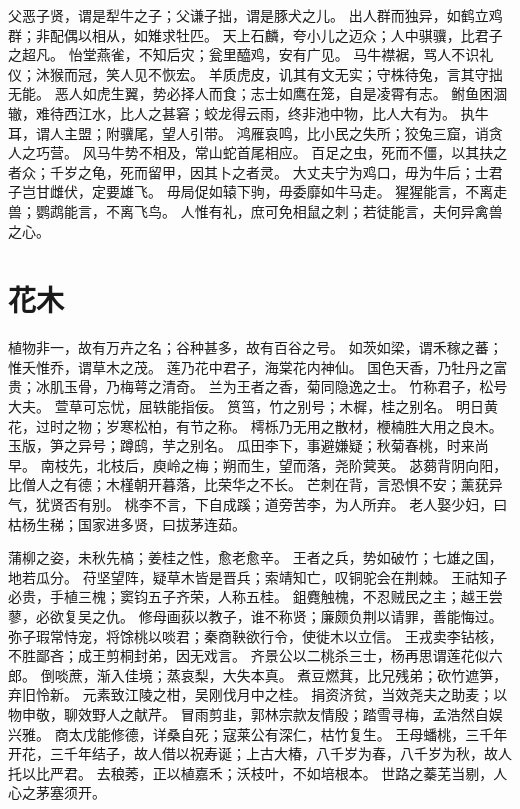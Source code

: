\documentclass[12pt,UTF8]{ctexbook}
\begin{document}
父恶子贤，谓是犁牛之子；父谦子拙，谓是豚犬之儿。
出人群而独异，如鹤立鸡群；非配偶以相从，如雉求牡匹。
天上石麟，夸小儿之迈众；人中骐骥，比君子之超凡。
怡堂燕雀，不知后灾；瓮里醯鸡，安有广见。
马牛襟裾，骂人不识礼仪；沐猴而冠，笑人见不恢宏。
羊质虎皮，讥其有文无实；守株待兔，言其守拙无能。
恶人如虎生翼，势必择人而食；志士如鹰在笼，自是凌霄有志。
鲋鱼困涸辙，难待西江水，比人之甚窘；蛟龙得云雨，终非池中物，比人大有为。
执牛耳，谓人主盟；附骥尾，望人引带。
鸿雁哀鸣，比小民之失所；狡兔三窟，诮贪人之巧营。
风马牛势不相及，常山蛇首尾相应。
百足之虫，死而不僵，以其扶之者众；千岁之龟，死而留甲，因其卜之者灵。
大丈夫宁为鸡口，毋为牛后；士君子岂甘雌伏，定要雄飞。
毋局促如辕下驹，毋委靡如牛马走。
猩猩能言，不离走兽；鹦鹉能言，不离飞鸟。
人惟有礼，庶可免相鼠之刺；若徒能言，夫何异禽兽之心。

\chapter{花木}

植物非一，故有万卉之名；谷种甚多，故有百谷之号。
如茨如梁，谓禾稼之蕃；惟夭惟乔，谓草木之茂。
莲乃花中君子，海棠花内神仙。
国色天香，乃牡丹之富贵；冰肌玉骨，乃梅萼之清奇。
兰为王者之香，菊同隐逸之士。
竹称君子，松号大夫。
萱草可忘忧，屈轶能指佞。
筼筜，竹之别号；木樨，桂之别名。
明日黄花，过时之物；岁寒松柏，有节之称。
樗栎乃无用之散材，楩楠胜大用之良木。
玉版，笋之异号；蹲鸱，芋之别名。
瓜田李下，事避嫌疑；秋菊春桃，时来尚早。
南枝先，北枝后，庾岭之梅；朔而生，望而落，尧阶蓂荚。
苾蒭背阴向阳，比僧人之有德；木槿朝开暮落，比荣华之不长。
芒刺在背，言恐惧不安；薰莸异气，犹贤否有别。
桃李不言，下自成蹊；道旁苦李，为人所弃。
老人娶少妇，曰枯杨生稊；国家进多贤，曰拔茅连茹。

蒲柳之姿，未秋先槁；姜桂之性，愈老愈辛。
王者之兵，势如破竹；七雄之国，地若瓜分。
苻坚望阵，疑草木皆是晋兵；索靖知亡，叹铜驼会在荆棘。
王祜知子必贵，手植三槐；窦钧五子齐荣，人称五桂。
鉏麑触槐，不忍贼民之主；越王尝蓼，必欲复吴之仇。
修母画荻以教子，谁不称贤；廉颇负荆以请罪，善能悔过。
弥子瑕常恃宠，将馀桃以啖君；秦商鞅欲行令，使徙木以立信。
王戎卖李钻核，不胜鄙吝；成王剪桐封弟，因无戏言。
齐景公以二桃杀三士，杨再思谓莲花似六郎。
倒啖蔗，渐入佳境；蒸哀梨，大失本真。
煮豆燃萁，比兄残弟；砍竹遮笋，弃旧怜新。
元素致江陵之柑，吴刚伐月中之桂。
捐资济贫，当效尧夫之助麦；以物申敬，聊效野人之献芹。
冒雨剪韭，郭林宗款友情殷；踏雪寻梅，孟浩然自娱兴雅。
商太戊能修德，详桑自死；寇莱公有深仁，枯竹复生。
王母蟠桃，三千年开花，三千年结子，故人借以祝寿诞；上古大椿，八千岁为春，八千岁为秋，故人托以比严君。
去稂莠，正以植嘉禾；沃枝叶，不如培根本。
世路之蓁芜当剔，人心之茅塞须开。
\end{document}
